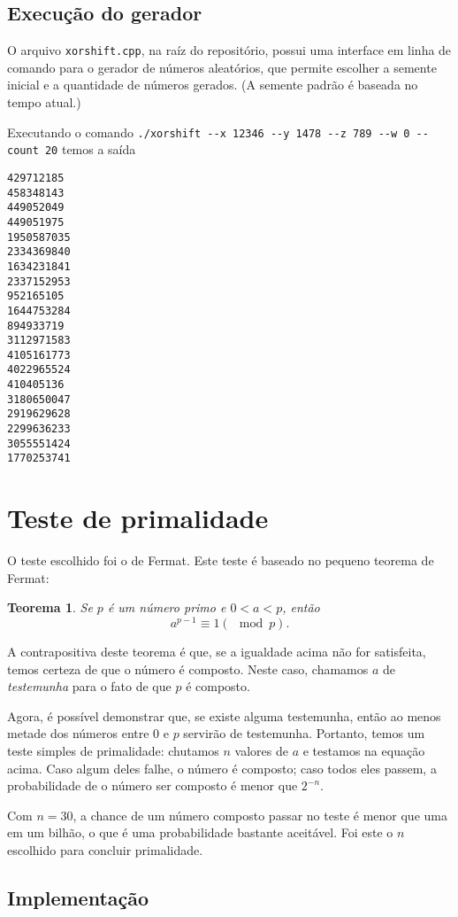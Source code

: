 \documentclass{article}
\newtheorem{theorem}{Teorema}
\begin{document}
\subsection{Execução do gerador}

O arquivo \verb"xorshift.cpp", na raíz do repositório,
possui uma interface em linha de comando para o gerador de números aleatórios,
que permite escolher a semente inicial e a quantidade de números gerados.
(A semente padrão é baseada no tempo atual.)

Executando o comando \verb"./xorshift --x 12346 --y 1478 --z 789 --w 0 --count 20"
temos a saída
\begin{verbatim}
429712185
458348143
449052049
449051975
1950587035
2334369840
1634231841
2337152953
952165105
1644753284
894933719
3112971583
4105161773
4022965524
410405136
3180650047
2919629628
2299636233
3055551424
1770253741
\end{verbatim}

\section{Teste de primalidade}

O teste escolhido foi o de Fermat.
Este teste é baseado no pequeno teorema de Fermat:
\begin{theorem}
    Se $p$ é um número primo e $0 < a < p$, então
    \begin{equation*}
        a^{p-1} \equiv 1 (\mod p).
    \end{equation*}
\end{theorem}
A contrapositiva deste teorema é que,
se a igualdade acima não for satisfeita,
temos certeza de que o número é composto.
Neste caso,
chamamos $a$ de \emph{testemunha} para o fato de que $p$ é composto.

Agora, é possível demonstrar que,
se existe alguma testemunha,
então ao menos metade dos números entre $0$ e $p$ servirão de testemunha.
Portanto, temos um teste simples de primalidade:
chutamos $n$ valores de $a$ e testamos na equação acima.
Caso algum deles falhe,
o número é composto;
caso todos eles passem,
a probabilidade de o número ser composto é menor que $2^{-n}$.

Com $n = 30$, a chance de um número composto passar no teste
é menor que uma em um bilhão,
o que é uma probabilidade bastante aceitável.
Foi este o $n$ escolhido para concluir primalidade.

\subsection{Implementação}
\end{document}
